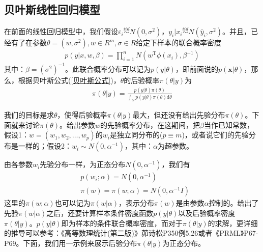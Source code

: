     \subsection{贝叶斯线性回归模型}
        \par
        在前面的线性回归模型中，我们假设$\varepsilon_i \overset{iid}{\sim}N(0,\sigma^2)$，$y_i|x_i\overset{iid}{\sim}N(\hat{y}_i,\sigma^2)$。并且，已经有了在参数$\theta = (w,\sigma^2),w\in R^m,\sigma\in R$给定下样本的联合概率密度
        \begin{align*}
        p(y|x,w,\beta) = \prod_{i=1}^nN(w^\mathrm{T}\phi(x_i),\beta^{-1})
        \end{align*}
        其中：$\beta = (\sigma^2)^{-1}$。此联合概率分布可以记为$p(y|\theta)$，即前面说的$p(\mathbf{x}|\theta)$，那么，根据贝叶斯公式(\ref{贝叶斯公式})，$\theta$的后验概率$\pi(\theta|y)$为
        \begin{align*}
        \pi(\theta|y) = \frac{p(y|\theta)\pi(\theta)}{\int_\Theta p(y|\theta)\pi(\theta)\mathrm{d}\theta}
        \end{align*}
        \par
        我们的目标是求$\theta$，使得后验概率$\pi(\theta|y)$最大，但还没有给出先验分布$\pi(\theta)$。下面就来讨论$\pi(\theta)$。给出参数$w$的先验概率分布，在这期间，把$\beta$当作已知常数，假设1：$w = (w_1,w_2,\dots,w_p)$的$w_i$是独立同分布的($p \equiv m$)，或者说它们的先验分布是一样的；假设2：$w_i\sim N(0,\alpha^{-1})$，其中：$\alpha$为超参数。
        \par
        由各参数$w_i$先验分布一样，为正态分布$N(0,\alpha^{-1})$，我们有
        \begin{align*}
        &p(w_i;\alpha) = N(0,\alpha^{-1})\\
        &\pi(w) = \pi(w;\alpha) = N(0,\alpha^{-1}I)
        \end{align*}
        这里的$\pi(w;\alpha)$也可以记为$\pi(w|\alpha)$，表示分布$\pi(w)$是由参数$\alpha$控制的。给出了先验$\pi(w|\alpha)$之后，还要计算样本条件密度函数$p(y|\theta)$以及后验概率密度$\pi(\theta|y)$。$p(y|\theta)$即为样本的条件联合概率密度，而对于$\pi(\theta|y)$的求解，更详细的推导可以参考：《高等数理统计(第二版)》茆诗松P350例5.26或者《PRML》P67-P69。下面，我们用一示例来展示后验分布$\pi(\theta|y)$为正态分布。
